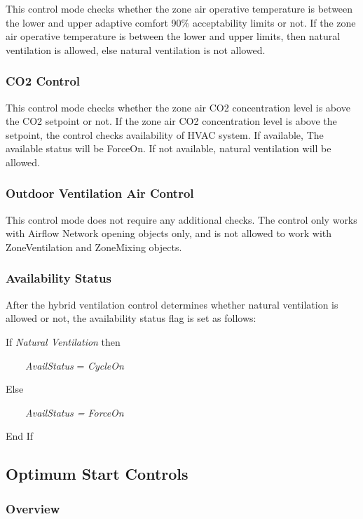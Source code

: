  This control mode checks whether the zone air operative temperature is between the lower and upper adaptive comfort 90\% acceptability limits or not. If the zone air operative temperature is between the lower and upper limits, then natural ventilation is allowed, else natural ventilation is not allowed.

\subsubsection{CO2 Control}\label{co2-control}

 This control mode checks whether the zone air CO2 concentration level is above the CO2 setpoint or not. If the zone air CO2 concentration level is above the setpoint, the control checks availability of HVAC system. If available, The available status will be ForceOn. If not available, natural ventilation will be allowed.

\subsubsection{Outdoor Ventilation Air Control}\label{outdoor-ventilation-air-control}

This control mode does not require any additional checks. The control only works with Airflow Network opening objects only, and is not allowed to work with ZoneVentilation and ZoneMixing objects.

\subsubsection{Availability Status}\label{availability-status}

After the hybrid ventilation control determines whether natural ventilation is allowed or not, the availability status flag is set as follows:

If \emph{Natural Ventilation} then

~~~~\emph{AvailStatus} = \emph{CycleOn}

Else

~~~~\emph{AvailStatus = ForceOn}

End If

\subsection{Optimum Start Controls}\label{optimum-start-controls}

\subsubsection{Overview}\label{overview-1-008}

